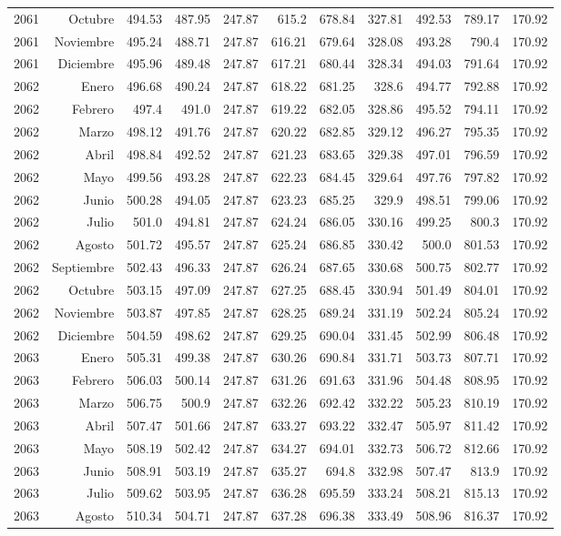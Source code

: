 \documentclass{article}%
\begin{document}
\begin{longtable}{|l r|r|r|r|r|r|r|r|r|r|}
2061&Octubre&494.53&487.95&247.87&615.2&678.84&327.81&492.53&789.17&170.92\\%
2061&Noviembre&495.24&488.71&247.87&616.21&679.64&328.08&493.28&790.4&170.92\\%
2061&Diciembre&495.96&489.48&247.87&617.21&680.44&328.34&494.03&791.64&170.92\\%
2062&Enero&496.68&490.24&247.87&618.22&681.25&328.6&494.77&792.88&170.92\\%
2062&Febrero&497.4&491.0&247.87&619.22&682.05&328.86&495.52&794.11&170.92\\%
2062&Marzo&498.12&491.76&247.87&620.22&682.85&329.12&496.27&795.35&170.92\\%
2062&Abril&498.84&492.52&247.87&621.23&683.65&329.38&497.01&796.59&170.92\\%
2062&Mayo&499.56&493.28&247.87&622.23&684.45&329.64&497.76&797.82&170.92\\%
2062&Junio&500.28&494.05&247.87&623.23&685.25&329.9&498.51&799.06&170.92\\%
2062&Julio&501.0&494.81&247.87&624.24&686.05&330.16&499.25&800.3&170.92\\%
2062&Agosto&501.72&495.57&247.87&625.24&686.85&330.42&500.0&801.53&170.92\\%
2062&Septiembre&502.43&496.33&247.87&626.24&687.65&330.68&500.75&802.77&170.92\\%
2062&Octubre&503.15&497.09&247.87&627.25&688.45&330.94&501.49&804.01&170.92\\%
2062&Noviembre&503.87&497.85&247.87&628.25&689.24&331.19&502.24&805.24&170.92\\%
2062&Diciembre&504.59&498.62&247.87&629.25&690.04&331.45&502.99&806.48&170.92\\%
2063&Enero&505.31&499.38&247.87&630.26&690.84&331.71&503.73&807.71&170.92\\%
2063&Febrero&506.03&500.14&247.87&631.26&691.63&331.96&504.48&808.95&170.92\\%
2063&Marzo&506.75&500.9&247.87&632.26&692.42&332.22&505.23&810.19&170.92\\%
2063&Abril&507.47&501.66&247.87&633.27&693.22&332.47&505.97&811.42&170.92\\%
2063&Mayo&508.19&502.42&247.87&634.27&694.01&332.73&506.72&812.66&170.92\\%
2063&Junio&508.91&503.19&247.87&635.27&694.8&332.98&507.47&813.9&170.92\\%
2063&Julio&509.62&503.95&247.87&636.28&695.59&333.24&508.21&815.13&170.92\\%
2063&Agosto&510.34&504.71&247.87&637.28&696.38&333.49&508.96&816.37&170.92\\%

\end{longtable}
\end{document}
